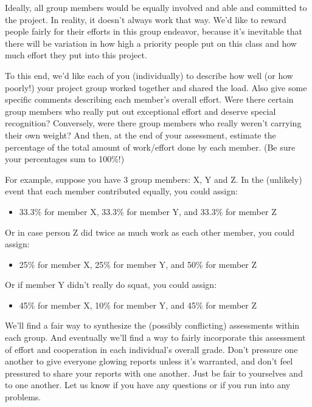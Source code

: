\documentclass[10pt]{article}
\begin{document}
Ideally, all group members would be equally involved and able and committed to the project.  In reality, it doesn't always work that way.  We'd like to reward people fairly for their efforts in this group endeavor, because it's inevitable that there will be variation in how high a priority people put on this class and how much effort they put into this project.  

To this end, we'd like each of you (individually) to describe how well (or how poorly!) your project group worked together and shared the load.  Also give some specific comments describing each member’s overall effort.  Were there certain group members who really put out exceptional effort and deserve special recognition?  Conversely, were there group members who really weren't carrying their own weight?  And then, at the end of your assessment, estimate the percentage of the total amount of work/effort done by each member.  (Be sure your percentages sum to 100\%!)  

For example, suppose you have 3 group members: X, Y and Z.  In the (unlikely) event that each member contributed equally, you could assign:
	\begin{itemize}
		\item 33.3\% for member X,
		33.3\% for member Y, and
		33.3\% for member Z
	\end{itemize}

Or in case person Z did twice as much work as each other member, you could assign:
	\begin{itemize}
		\item 25\% for member X,
		25\% for member Y, and
		50\% for member Z
	\end{itemize}

Or if member Y didn’t really do squat, you could assign:
	\begin{itemize}
		\item 45\% for member X,
		10\% for member Y, and
		45\% for member Z
	\end{itemize}

We'll find a fair way to synthesize the (possibly conflicting) assessments within each group.  And eventually we'll find a way to fairly incorporate this assessment of effort and cooperation in each individual's overall grade.  Don't pressure one another to give everyone glowing reports unless it's warranted, and don't feel pressured to share your reports with one another.  Just be fair to yourselves and to one another. Let us know if you have any questions or if you run into any problems.
\end{document}
